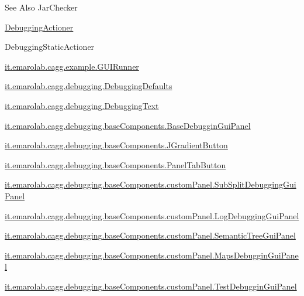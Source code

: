 \begin{DoxySeeAlso}{See Also}
Jar\-Checker 

\hyperlink{classit_1_1emarolab_1_1cagg_1_1debugging_1_1DebuggingGui_1_1DebuggingActioner}{Debugging\-Actioner} 

Debugging\-Static\-Actioner 

\hyperlink{classit_1_1emarolab_1_1cagg_1_1example_1_1GUIRunner}{it.\-emarolab.\-cagg.\-example.\-G\-U\-I\-Runner} 

\hyperlink{classit_1_1emarolab_1_1cagg_1_1debugging_1_1DebuggingDefaults}{it.\-emarolab.\-cagg.\-debugging.\-Debugging\-Defaults} 

\hyperlink{classit_1_1emarolab_1_1cagg_1_1debugging_1_1DebuggingText}{it.\-emarolab.\-cagg.\-debugging.\-Debugging\-Text} 

\hyperlink{classit_1_1emarolab_1_1cagg_1_1debugging_1_1baseComponents_1_1BaseDebugginGuiPanel}{it.\-emarolab.\-cagg.\-debugging.\-base\-Components.\-Base\-Debuggin\-Gui\-Panel} 

\hyperlink{classit_1_1emarolab_1_1cagg_1_1debugging_1_1baseComponents_1_1JGradientButton}{it.\-emarolab.\-cagg.\-debugging.\-base\-Components.\-J\-Gradient\-Button} 

\hyperlink{classit_1_1emarolab_1_1cagg_1_1debugging_1_1baseComponents_1_1PanelTabButton}{it.\-emarolab.\-cagg.\-debugging.\-base\-Components.\-Panel\-Tab\-Button} 

\hyperlink{classit_1_1emarolab_1_1cagg_1_1debugging_1_1baseComponents_1_1customPanel_1_1SubSplitDebuggingGuiPanel}{it.\-emarolab.\-cagg.\-debugging.\-base\-Components.\-custom\-Panel.\-Sub\-Split\-Debugging\-Gui\-Panel} 

\hyperlink{classit_1_1emarolab_1_1cagg_1_1debugging_1_1baseComponents_1_1customPanel_1_1LogDebuggingGuiPanel}{it.\-emarolab.\-cagg.\-debugging.\-base\-Components.\-custom\-Panel.\-Log\-Debugging\-Gui\-Panel} 

\hyperlink{classit_1_1emarolab_1_1cagg_1_1debugging_1_1baseComponents_1_1customPanel_1_1SemanticTreeGuiPanel}{it.\-emarolab.\-cagg.\-debugging.\-base\-Components.\-custom\-Panel.\-Semantic\-Tree\-Gui\-Panel} 

\hyperlink{classit_1_1emarolab_1_1cagg_1_1debugging_1_1baseComponents_1_1customPanel_1_1MapsDebugginGuiPanel}{it.\-emarolab.\-cagg.\-debugging.\-base\-Components.\-custom\-Panel.\-Maps\-Debuggin\-Gui\-Panel} 

\hyperlink{classit_1_1emarolab_1_1cagg_1_1debugging_1_1baseComponents_1_1customPanel_1_1TestDebugginGuiPanel}{it.\-emarolab.\-cagg.\-debugging.\-base\-Components.\-custom\-Panel.\-Test\-Debuggin\-Gui\-Panel} 


\end{DoxySeeAlso}
